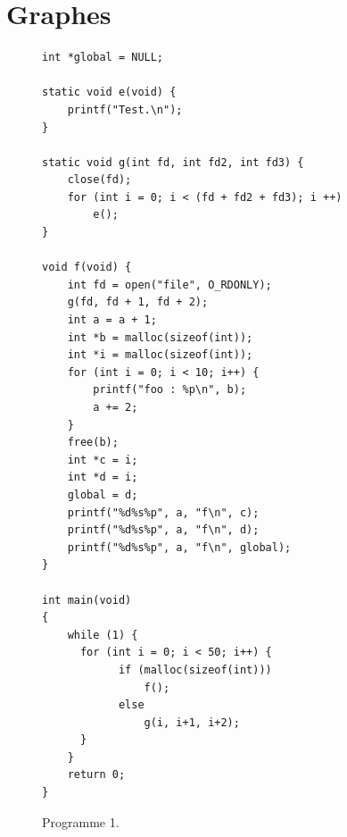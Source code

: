 \chapter{Graphes}

\begin{figure}[h]
    \centering
    \begin {lstlisting}[frame=single]
int *global = NULL;

static void e(void) {
    printf("Test.\n");
}

static void g(int fd, int fd2, int fd3) {
    close(fd);
    for (int i = 0; i < (fd + fd2 + fd3); i ++)
        e();
}

void f(void) {
    int fd = open("file", O_RDONLY);
    g(fd, fd + 1, fd + 2);
    int a = a + 1;
    int *b = malloc(sizeof(int));
    int *i = malloc(sizeof(int));
    for (int i = 0; i < 10; i++) {
        printf("foo : %
        a += 2;
    }
    free(b);
    int *c = i;
    int *d = i;
    global = d;
    printf("%
    printf("%
    printf("%
}

int main(void)
{
    while (1) {
      for (int i = 0; i < 50; i++) {
            if (malloc(sizeof(int)))
                f();
            else
                g(i, i+1, i+2);
      }
    }
    return 0;
}
    \end{lstlisting}
    \caption{Programme 1.}
\end{figure}


